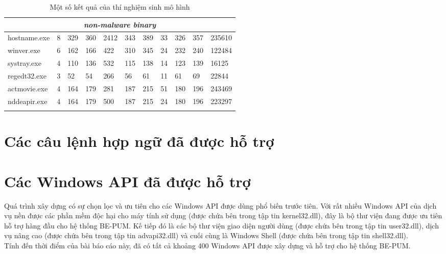 \begin{small}
\begin{longtable}{|l|l|l|l|l|l|l|l|l|l|l|}
\multicolumn{11}{|c|}{\it non-malware binary}  \\ \hline
hostname.exe	& 8 & 329	& 360 &	2412 &    343 &	389 & 	33 & 326 &  357 & 	235610 \\ \hline
winver.exe	& 6 & 162	& 166 &	422 &	310 &	345 &	24 & 232 &  240 &	122484 \\ \hline
systray.exe	& 4 & 110	& 136 & 532 &	115 & 	138 &	14 & 123 &	139 &	16125 \\ \hline
regedt32.exe	& 3 & 52	& 54  &	266 &	56  &	61  & 	11 & 61  &	69  &	22844 \\ \hline
actmovie.exe	& 4 & 164	& 179 &	281 &	187 & 	215 & 	51 & 180 &	196 &	243469 \\ \hline
nddeapir.exe	& 4& 164	& 179 &	500 &	187 & 	215 & 	24 & 180 &	196 &	223297 \\ \hline

\caption {Một số kết quả của thí nghiệm sinh mô hình}\label{tab:virusExp}
\end{longtable}
\end{small}


\section{Các câu lệnh hợp ngữ đã được hỗ trợ}

\section{Các Windows API đã được hỗ trợ}

Quá trình xây dựng có sự chọn lọc và ưu tiên cho các Windows API được dùng phổ biến trước tiên. Với rất nhiều Windows API của dịch vụ nền được các phần mềm độc hại cho máy tính sử dụng (được chứa bên trong tập tin kernel32.dll), đây là bộ thư viện đang được ưu tiên hỗ trợ hàng đầu cho hệ thống BE-PUM. Kế tiếp đó là các bộ thư viện giao diện người dùng (được chứa bên trong tập tin user32.dll), dịch vụ nâng cao (được chứa bên trong tập tin advapi32.dll) và cuối cùng là Windows Shell (được chứa bên trong tập tin shell32.dll).\\

Tính đến thời điểm của bài báo cáo này, đã có tất cả khoảng 400 Windows API được xây dựng và hỗ trợ cho hệ thống BE-PUM.


